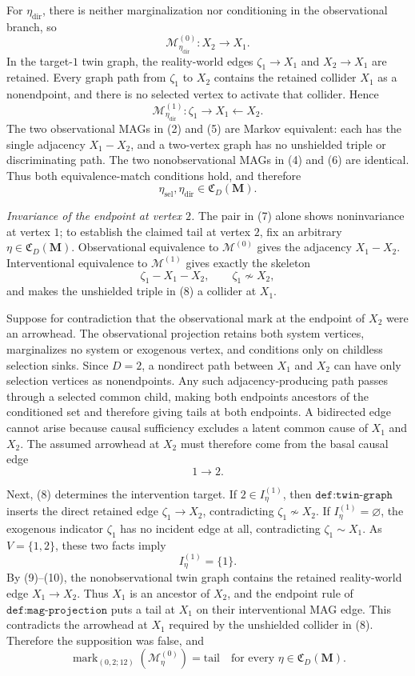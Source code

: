 For \(\eta_{\mathrm{dir}}\), there is neither marginalization nor conditioning in the
observational branch, so
\[
 \mathcal M_{\eta_{\mathrm{dir}}}^{(0)}:
 X_2\longrightarrow X_1.
 \tag{5}
\]
In the target-\(1\) twin graph, the reality-world edges
\(\zeta_1\to X_1\) and \(X_2\to X_1\) are retained.  Every graph path from
\(\zeta_1\) to \(X_2\) contains the retained collider \(X_1\) as a nonendpoint,
and there is no selected vertex to activate that collider.  Hence
\[
 \mathcal M_{\eta_{\mathrm{dir}}}^{(1)}:
 \zeta_1\longrightarrow X_1\longleftarrow X_2.
 \tag{6}
\]
The two observational MAGs in (2) and (5) are Markov equivalent: each has the
single adjacency \(X_1-X_2\), and a two-vertex graph has no unshielded triple or
discriminating path.  The two nonobservational MAGs in (4) and (6) are identical.
Thus both equivalence-match conditions hold, and therefore
\[
 \eta_{\mathrm{sel}},\eta_{\mathrm{dir}}
 \in\mathfrak C_D(\mathbf M).
 \tag{7}
\]

\emph{Invariance of the endpoint at vertex \(2\).}
The pair in (7) alone shows noninvariance at vertex \(1\); to establish the claimed
tail at vertex \(2\), fix an arbitrary
\(\eta\in\mathfrak C_D(\mathbf M)\).  Observational equivalence to
\(\mathcal M^{(0)}\) gives the adjacency \(X_1-X_2\).  Interventional equivalence to
\(\mathcal M^{(1)}\) gives exactly the skeleton
\[
 \zeta_1-X_1-X_2,
 \qquad
 \zeta_1\not\sim X_2,
 \tag{8}
\]
and makes the unshielded triple in (8) a collider at \(X_1\).

Suppose for contradiction that the observational mark at the endpoint of \(X_2\)
were an arrowhead.  The observational projection retains both system vertices,
marginalizes no system or exogenous vertex, and conditions only on childless selection
sinks.  Since \(D=2\), a nondirect path between \(X_1\) and \(X_2\) can have only
selection vertices as nonendpoints.  Any such adjacency-producing path passes through
a selected common child, making both endpoints ancestors of the conditioned set and
therefore giving tails at both endpoints.  A bidirected edge cannot arise because causal
sufficiency excludes a latent common cause of \(X_1\) and \(X_2\).  The assumed
arrowhead at \(X_2\) must therefore come from the basal causal edge
\[
 1\longrightarrow2.
 \tag{9}
\]

Next, (8) determines the intervention target.  If
\(2\in I_\eta^{(1)}\), then \(\texttt{def:twin-graph}\) inserts the direct retained
edge \(\zeta_1\to X_2\), contradicting \(\zeta_1\not\sim X_2\).  If
\(I_\eta^{(1)}=\varnothing\), the exogenous indicator \(\zeta_1\) has no incident
edge at all, contradicting \(\zeta_1\sim X_1\).  As \(V=\{1,2\}\), these two
facts imply
\[
 I_\eta^{(1)}=\{1\}.
 \tag{10}
\]
By (9)--(10), the nonobservational twin graph contains the retained reality-world
edge \(X_1\to X_2\).  Thus \(X_1\) is an ancestor of \(X_2\), and the endpoint
rule of \(\texttt{def:mag-projection}\) puts a tail at \(X_1\) on their
interventional MAG edge.  This contradicts the arrowhead at \(X_1\) required by the
unshielded collider in (8).  Therefore the supposition was false, and
\[
 \operatorname{mark}_{(0,2;12)}(\mathcal M_\eta^{(0)})
 =\mathrm{tail}
 \quad\text{for every }\eta\in\mathfrak C_D(\mathbf M).
 \tag{11}
\]


